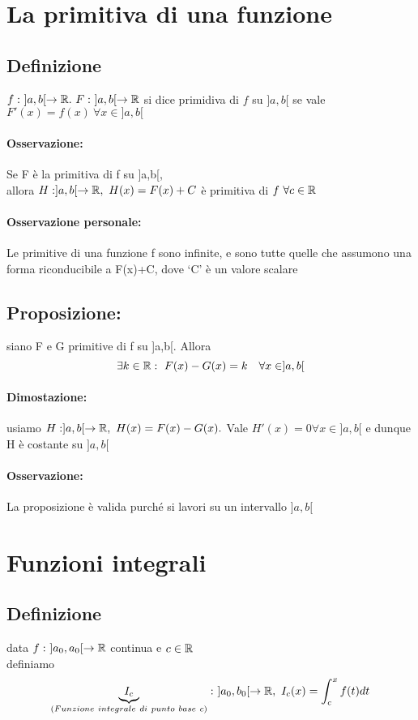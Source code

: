 \documentclass[a4paper]{article}
\begin{document}
\section{La primitiva di una funzione}

\subsection{Definizione} $ f:\ ]a,b[ \to \mathbb{R}. \ F:\ ]a,b[ \to \mathbb{R}$ si dice primidiva di $f$ su $]a,b[$ se vale $F'(x)=f(x) \ \forall x \in ]a,b[$

\paragraph{Osservazione:} Se F è la primitiva di f su ]a,b[,\\ allora $H: ]a,b[ \to \mathbb{R},\ H(x)=F(x)+C$ è primitiva di $f\ \forall c \in \mathbb{R}$

\paragraph{Osservazione personale:} Le primitive di una funzione f sono infinite, e sono tutte quelle che assumono una forma riconducibile a F(x)+C, dove `C' è un valore scalare

\subsection{Proposizione:} siano F e G primitive di f su ]a,b[. Allora
$$
	\exists k \in \mathbb{R} : \ F(x)-G(x) = k \quad \forall x \in ]a,b[
$$
\paragraph{Dimostazione:} usiamo $ H:]a,b[ \to \R,\ H(x)=F(x)-G(x).$
	Vale $ H'(x)=0 \forall x \in ]a,b[ $ e dunque H è costante su $]a,b[$

\paragraph{Osservazione:} La proposizione è valida purché si lavori su un intervallo $]a,b[$


\section{Funzioni integrali}
\subsection{Definizione} data $f: \ ]a_0,a_0[ \to \mathbb{R} $ continua e $c \in \mathbb{R}$ \\
definiamo $$
\underbrace{I_c}_{(Funzione\ integrale\ di\ punto\ base\ c)} : \ ]a_0,b_0[ \to \R, \ I_c(x) = \int_c^x f(t) dt
$$
\end{document}
